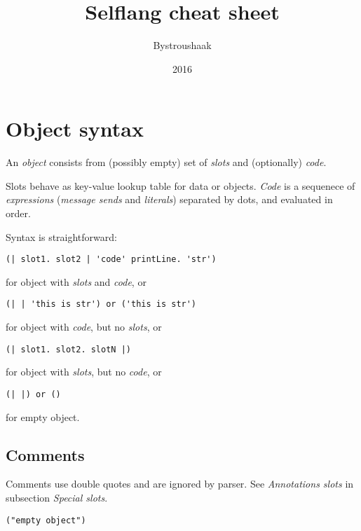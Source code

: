 \documentclass[10pt]{article}
\title{Selflang cheat sheet}
\author{Bystroushaak}
\date{2016}
\renewcommand{\maketitle}{
    {\begin{center}\Large \mythetitle\end{center}}
}
\begin{document}
\begin{multicols*}{3}
\maketitle

\section{Object syntax}

An \textit{object} consists from (possibly empty) set of \textit{slots} and (optionally) \textit{code}.

Slots behave as key-value lookup table for data or objects. \textit{Code} is a sequenece of \textit{expressions} (\textit{message sends} and \textit{literals}) separated by dots, and evaluated in order.

Syntax is straightforward:

\begin{lstlisting}
(| slot1. slot2 | 'code' printLine. 'str')
\end{lstlisting}

for object with \textit{slots} and \textit{code}, or

\begin{lstlisting}
(| | 'this is str') or ('this is str')
\end{lstlisting}

for object with \textit{code}, but no \textit{slots}, or

\begin{lstlisting}
(| slot1. slot2. slotN |)
\end{lstlisting}

for object with \textit{slots}, but no \textit{code}, or

\begin{lstlisting}
(| |) or ()
\end{lstlisting}

for empty object.



\subsection{Comments}

Comments use double quotes and are ignored by parser. See \textit{Annotations slots} in subsection \textit{Special slots}.

\begin{lstlisting}
("empty object")
\end{lstlisting}





\end{multicols*}
\end{document}
